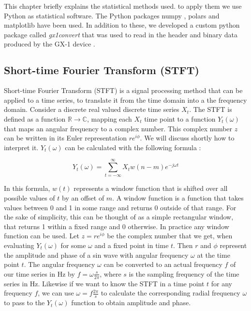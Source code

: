 \documentclass[12 pt]{scrartcl}
\begin{document}
This chapter briefly explains the statistical methods used. to apply them we use Python \citep{python} as statistical software. The Python packages numpy \citep{numpy}, polars \citep{polars} and matplotlib \citep{matplotlib} have been used. In addition to these, we developed a custom python package called \emph{gx1convert} \citep{gx1convert} that was used to read in the header and binary data produced by the GX-1 device \citep{gx1convert}.

\subsection{Short-time Fourier Transform (STFT)}

Short-time Fourier Transform (STFT) is a signal processing method that can be applied to a time series, to translate it from the time domain into a the frequency domain. Consider a discrete real valued discrete time series $X_t$. The STFT is defined as a function $\mathbb{R} \rightarrow \mathbb{C}$, mapping each $X_t$ time point to a function $Y_t(\omega)$ that maps an angular frequency to a complex number. This complex number $z$ can be written in its Euler representation $r e^{i \phi}$. We will discuss shortly how to interpret it. $Y_t(\omega)$ can be calculated with the following formula \citep{SASPWEB2011}:

\[ Y_t(\omega) = \sum_{t=-\infty}^{\infty}{X_t w(n-m) e^{-j \omega t}}  \]

In this formula, $w(t)$ represents a window function that is shifted over all possible values of $t$ by an offset of $m$. A window function is a function that takes values between 0 and 1 in some range and returns 0 outside of that range. For the sake of simplicity, this can be thought of as a simple rectangular window, that returns 1 within a fixed range and 0 otherwise. In practice any window function can be used. Let $z = r e^{i \phi}$ be the complex number that we get, when evaluating $Y_t(\omega)$ for some $\omega$ and a fixed point in time $t$. Then $r$ and $\phi$ represent the amplitude and phase of a sin wave with angular frequency $\omega$ at the time point $t$. The angular frequency $\omega$ can be converted to an actual frequency $f$ of our time series in Hz by $f = \omega \frac{s}{2 \pi}$, where $s$ is the sampling frequency of the time series in Hz. Likewise if we want to know the STFT in a time point $t$ for any frequency $f$, we can use $\omega = f \frac{2 \pi}{s}$ to calculate the corresponding radial frequency $\omega$ to pass to the $Y_t(\omega)$ function to obtain amplitude and phase.
\end{document}
